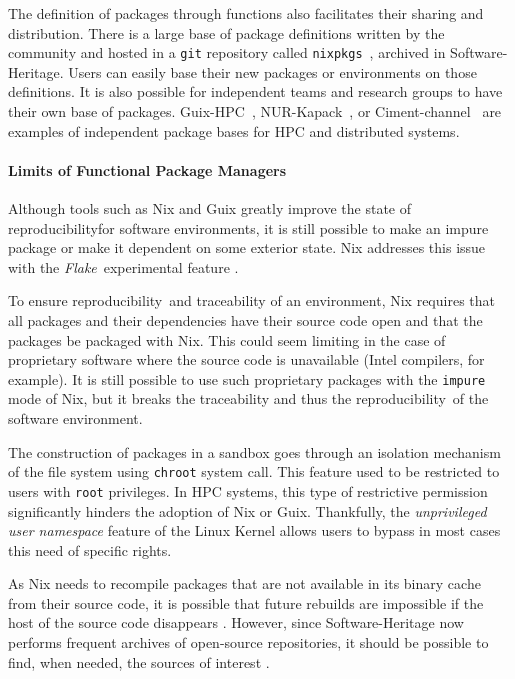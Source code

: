 \documentclass[sigconf,natbib=false]{acmart}
\newcommand{\repro}{reproducibility}
\begin{document}
The definition of packages through functions also facilitates their sharing and distribution.
There is a large base of package definitions written by the community and hosted in a \texttt{git} repository called \texttt{nixpkgs}\ \cite{nixpkgs, repology}, archived in Software-Heritage.
Users can easily base their new packages or environments on those definitions.
It is also possible for independent teams and research groups to have their own base of packages.
Guix-HPC\ \cite{guix-hpc}, NUR-Kapack\ \cite{kapack}, or Ciment-channel\ \cite{ciment_channel} are examples of independent package bases for HPC and distributed systems.

\paragraph{Limits of Functional Package Managers}

Although tools such as Nix and Guix greatly improve the state of \repro for software environments, it is still possible to make an impure package or make it dependent on some exterior state.
Nix addresses this issue with the \emph{Flake}\ experimental feature \cite{flakes}.

\afterpage{\FloatBarrier}


To ensure \repro\ and traceability of an environment, Nix requires that all packages and their dependencies have their source code open and that the packages be packaged with Nix.
This could seem limiting in the case of proprietary software where the source code is unavailable (Intel compilers, for example).
It is still possible to use such proprietary packages with the \texttt{impure} mode of Nix, but it breaks the traceability and thus the \repro\ of the software environment. 

The construction of packages in a sandbox goes through an isolation mechanism of the file system using \texttt{chroot} system call.
This feature used to be restricted to users with \texttt{root} privileges.
In HPC systems, this type of restrictive permission significantly hinders the adoption of Nix or Guix.
Thankfully, the \emph{unprivileged user namespace} feature of the Linux Kernel allows users to bypass in most cases this need of specific rights.

As Nix needs to recompile packages that are not available in its binary cache from their source code, it is possible that future rebuilds are impossible if the host of the source code disappears \cite{blinry}.
However, since Software-Heritage now performs frequent archives of open-source repositories, it should be possible to find, when needed, the sources of interest \cite{courtesconnecting}.
\end{document}
